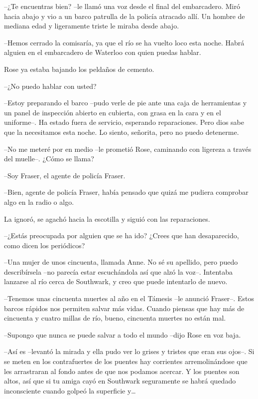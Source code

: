 {--¿Te encuentras bien? --le llamó una voz desde el final del
 embarcadero. Miró hacia abajo y vio a un barco patrulla de la policía
 atracado allí. Un hombre de mediana edad y ligeramente triste le miraba
desde abajo.}

{--Hemos cerrado la comisaría, ya que el río se ha vuelto loco esta
 noche. Habrá alguien en el embarcadero de Waterloo con quien puedas
hablar.}

{Rose ya estaba bajando los peldaños de cemento.}

{--¿No puedo hablar con usted?}

{--Estoy preparando el barco --pudo verle de pie ante una caja de
 herramientas y un panel de inspección abierto en cubierta, con grasa en
 la cara y en el uniforme--. Ha estado fuera de servicio, esperando
 reparaciones. Pero dios sabe que la necesitamos esta noche. Lo siento,
señorita, pero no puedo detenerme.}

{--No me meteré por en medio --le prometió Rose, caminando con ligereza
a través del muelle--. ¿Cómo se llama?}

{--Soy Fraser, el agente de policía Fraser.}

{--Bien, agente de policía Fraser, había pensado que quizá me pudiera
comprobar algo en la radio o algo.}

{La ignoró, se agachó hacia la escotilla y siguió con las reparaciones.}

{--¿Estás preocupada por alguien que se ha ido? ¿Crees que han
desaparecido, como dicen los periódicos?}

{--Una mujer de unos cincuenta, llamada Anne. No sé su apellido, pero
 puedo describírsela --no parecía estar escuchándola así que alzó la
 voz--. Intentaba lanzarse al río cerca de Southwark, y creo que puede
intentarlo de nuevo.}

{--Tenemos unas cincuenta muertes al año en el Támesis --le anunció
 Fraser--. Estos barcos rápidos nos permiten salvar más vidas. Cuando
 piensas que hay más de cincuenta y cuatro millas de río, bueno,
cincuenta muertes no están mal.}

{--Supongo que nunca se puede salvar a todo el mundo --dijo Rose en voz
baja.}

{--Así es --levantó la mirada y ella pudo ver lo grises y tristes que
 eran sus ojos--. Si se meten en los contrafuertes de los puentes hay
 corrientes arremolinándose que les arrastraran al fondo antes de que nos
 podamos acercar. Y los puentes son altos, así que si tu amiga cayó en
 Southwark seguramente se habrá quedado inconsciente cuando golpeó la
 superficie y\ldots{}}

